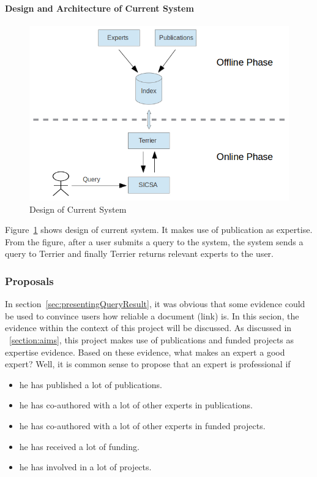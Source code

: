 \paragraph{Design and Architecture of Current System}

 \begin{figure}
 \centering
 \includegraphics[scale=0.5,keepaspectratio]{./figures/currentSystemDesign.jpg}
 \caption{Design of Current System} \label{fig:currentDesign} 
\end{figure}
Figure~\ref{fig:currentDesign} shows design of current system. It makes use of publication as expertise. From the figure, after a user submits a query
to the system, the system sends a query to Terrier and finally Terrier returns relevant experts to the user.

\subsubsection{Proposals}\label{section:goodexpert}
In section~\ref{sec:presentingQueryResult}, it was obvious that some evidence could be used to convince users how reliable a document (link) is.
In this secion, the evidence within
the context of this project will be discussed. As discussed in ~\ref{section:aims}, this project makes use of publications and funded projects as 
expertise evidence. Based on these evidence, what makes an expert a good expert? Well, it is common sense to propose that an expert is professional if 
\begin{itemize}
 \item he has published a lot of publications.
 \item he has co-authored with a lot of other experts in publications.
 \item he has co-authored with a lot of other experts in funded projects.
 \item he has received a lot of funding.
 \item he has involved in a lot of projects.
\end{itemize}

